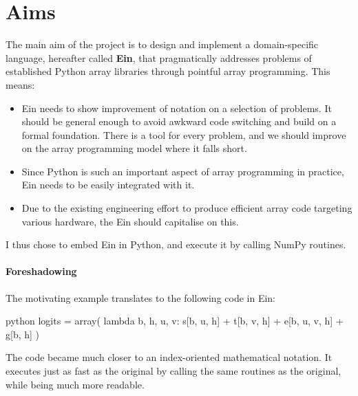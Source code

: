 \section{Aims}

The main aim of the project is to design and implement a domain-specific language, hereafter called \textbf{Ein}, that pragmatically addresses problems of established Python array libraries through pointful array programming. This means:
\begin{itemize}
    \item Ein needs to show improvement of notation on a selection of problems. It should be general enough to avoid awkward code switching and build on a formal foundation. There is a tool for every problem, and we should improve on the array programming model where it falls short. 
    \item Since Python is such an important aspect of array programming in practice, Ein needs to be easily integrated with it. 
    \item Due to the existing engineering effort to produce efficient array code targeting various hardware, the Ein should capitalise on this.
\end{itemize}
I thus chose to embed Ein in Python, and execute it by calling NumPy routines.

\paragraph{Foreshadowing} The motivating example translates to the following code in Ein:
\begin{center}
\begin{cminted}{python}
logits = array(
    lambda b, h, u, v: s[b, u, h] + t[b, v, h] + e[b, u, v, h] + g[b, h]
)
\end{cminted}
\end{center}
The code became much closer to an index-oriented mathematical notation. It executes just as fast as the original by calling the same routines as the original, while being much more readable.
